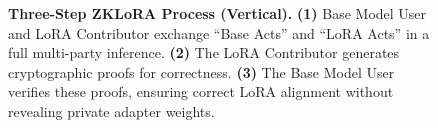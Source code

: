 \documentclass[11pt]{article}
\begin{document}
\begin{figure}[ht]
\caption{\textbf{Three-Step ZKLoRA Process (Vertical).}
\textbf{(1)} Base Model User and LoRA Contributor exchange ``Base Acts'' and ``LoRA Acts'' in a full multi-party inference. 
\textbf{(2)} The LoRA Contributor generates cryptographic proofs for correctness. 
\textbf{(3)} The Base Model User verifies these proofs, ensuring correct LoRA alignment without revealing private adapter weights.}
\label{fig:zklora_3steps}
\end{figure}
\end{document}
